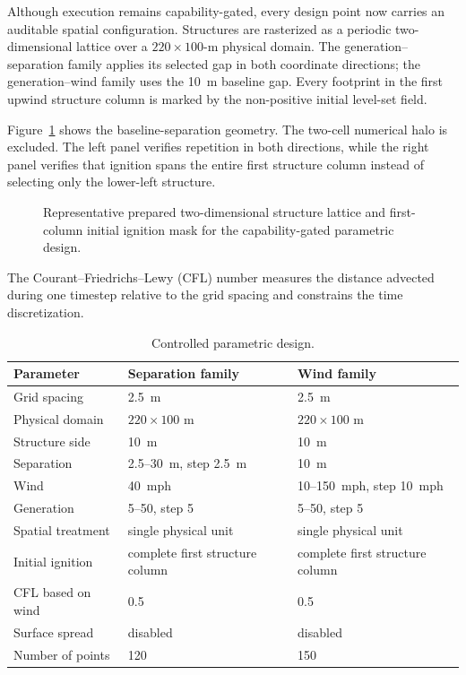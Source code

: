 Although execution remains capability-gated, every design point now carries an
auditable spatial configuration. Structures are rasterized as a periodic
two-dimensional lattice over a \(220\times100\)-m physical domain. The
generation--separation family applies its selected gap in both coordinate
directions; the generation--wind family uses the \SI{10}{m} baseline gap.
Every footprint in the first upwind structure column is marked by the
non-positive initial level-set field.

Figure~\ref{fig:input-configuration} shows the baseline-separation geometry.
The two-cell numerical halo is excluded. The left panel verifies repetition in
both directions, while the right panel verifies that ignition spans the entire
first structure column instead of selecting only the lower-left structure.

\begin{figure}[H]
\centering
{}
\caption{Representative prepared two-dimensional structure lattice and first-column
initial ignition mask for the capability-gated parametric design.}
\label{fig:input-configuration}
\end{figure}

The Courant--Friedrichs--Lewy (CFL) number measures the distance
advected during one timestep relative to the grid spacing and
constrains the time discretization.

\begin{table}[H]
\centering\small
\caption{Controlled parametric design.}
\begin{tabular}{lll}
\toprule
Parameter & Separation family & Wind family\tabularnewline
\midrule
Grid spacing & \SI{2.5}{m} & \SI{2.5}{m}\tabularnewline
Physical domain & \(220\times100\) m & \(220\times100\) m\tabularnewline
Structure side & \SI{10}{m} & \SI{10}{m}\tabularnewline
Separation & 2.5--\SI{30}{m}, step \SI{2.5}{m} & \SI{10}{m}\tabularnewline
Wind & \SI{40}{mph} & 10--\SI{150}{mph}, step \SI{10}{mph}\tabularnewline
Generation & 5--50, step 5 & 5--50, step 5\tabularnewline
Spatial treatment & single physical unit & single physical unit\tabularnewline
Initial ignition & complete first structure column & complete first structure column\tabularnewline
CFL based on wind & 0.5 & 0.5\tabularnewline
Surface spread & disabled & disabled\tabularnewline
Number of points & 120 & 150\tabularnewline
\bottomrule
\end{tabular}
\end{table}

